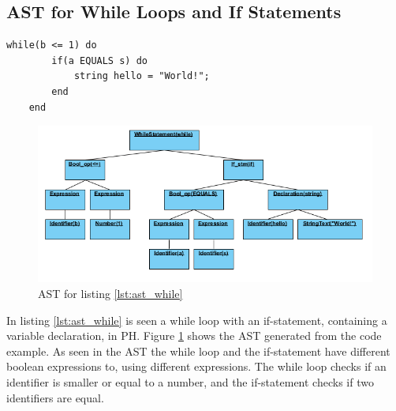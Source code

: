 \subsection{AST for While Loops and If Statements}
\begin{lstlisting}[caption=While loop with if-statement, label=lst:ast_while]
	while(b <= 1) do
		if(a EQUALS s) do
			string hello = "World!";
		end
	end
\end{lstlisting}
\begin{figure}[H]
	\centering
		\includegraphics[width=\textwidth]{billeder/while_AST.png}
		\caption{AST for listing \ref{lst:ast_while}}
		\label{fig:ast_while}
\end{figure}
In listing \ref{lst:ast_while} is seen a while loop with an if-statement, containing a variable declaration, in PH. Figure \ref{fig:ast_while} shows the AST generated from the code example. As seen in the AST the while loop and the if-statement have different boolean expressions to, using different expressions. The while loop checks if an identifier is smaller or equal to a number, and the if-statement checks if two identifiers are equal.